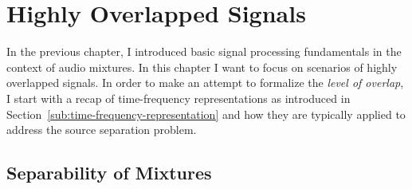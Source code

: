 \hypertarget{highly-overlapped-signals}{%
\chapter{Highly Overlapped Signals}\label{cha:highly-overlapped-signals}}

In the previous chapter, I introduced basic signal processing fundamentals in the context of audio mixtures.
In this chapter I want to focus on scenarios of highly overlapped signals.
In order to make an attempt to formalize the \emph{level of overlap}, I start with a recap of time-frequency representations as introduced in Section~\ref{sub:time-frequency-representation} and how they are typically applied to address the source separation problem.

\hypertarget{separability-of-mixtures}{%
\section{Separability of Mixtures}\label{separability-of-mixtures}}

